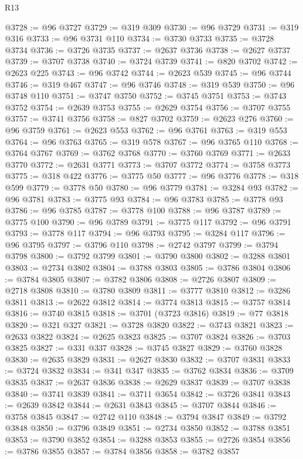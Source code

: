 \begin{lexlean}{R13}
\begin{coremodule}
{{{{{{{{{{{{{{{{{{{{{{{{{{{{{{{{{{{{{{{{{{{{{{{{{{{{{{{{{{{{{{{{{{{{{{{{{{{{{{{{{{{{{{{{{{{{{{{{{{{{{{{{{{@3728 := @96 @3727
@3729 := @319 @309
@3730 := @96 @3729
@3731 := @319 @316
@3733 := @96 @3731 @110
@3734 := @3730 @3733
@3735 := @3728 @3734
@3736 := @3726 @3735
@3737 := @2637 @3736
@3738 := @2627 @3737
@3739 := @3707 @3738
@3740 := @3724 @3739
@3741 := @820 @3702
@3742 := @2623 @225
@3743 := @96 @3742
@3744 := @2623 @539
@3745 := @96 @3744
@3746 := @319 @467
@3747 := @96 @3746
@3748 := @319 @539
@3750 := @96 @3748 @110
@3751 := @3747 @3750
@3752 := @3745 @3751
@3753 := @3743 @3752
@3754 := @2639 @3753
@3755 := @2629 @3754
@3756 := @3707 @3755
@3757 := @3741 @3756
@3758 := @827 @3702
@3759 := @2623 @276
@3760 := @96 @3759
@3761 := @2623 @553
@3762 := @96 @3761
@3763 := @319 @553
@3764 := @96 @3763
@3765 := @319 @578
@3767 := @96 @3765 @110
@3768 := @3764 @3767
@3769 := @3762 @3768
@3770 := @3760 @3769
@3771 := @2633 @3770
@3772 := @2631 @3771
@3773 := @3707 @3772
@3774 := @3758 @3773
@3775 := @318 @422
@3776 := @3775 @50
@3777 := @96 @3776
@3778 := @318 @599
@3779 := @3778 @50
@3780 := @96 @3779
@3781 := @3284 @93
@3782 := @96 @3781
@3783 := @3775 @93
@3784 := @96 @3783
@3785 := @3778 @93
@3786 := @96 @3785
@3787 := @3778 @100
@3788 := @96 @3787
@3789 := @3775 @100
@3790 := @96 @3789
@3791 := @3775 @117
@3792 := @96 @3791
@3793 := @3778 @117
@3794 := @96 @3793
@3795 := @3284 @117
@3796 := @96 @3795
@3797 := @3796 @110
@3798 := @2742 @3797
@3799 := @3794 @3798
@3800 := @3792 @3799
@3801 := @3790 @3800
@3802 := @3288 @3801
@3803 := @2734 @3802
@3804 := @3788 @3803
@3805 := @3786 @3804
@3806 := @3784 @3805
@3807 := @3782 @3806
@3808 := @2726 @3807
@3809 := @2718 @3808
@3810 := @3780 @3809
@3811 := @3777 @3810
@3812 := @3286 @3811
@3813 := @2622 @3812
@3814 := @3774 @3813
@3815 := @3757 @3814
@3816 := @3740 @3815
@3818 := @3701 (@3723 @3816)
@3819 := @77 @3818
@3820 := @321 @327
@3821 := @3728 @3820
@3822 := @3743 @3821
@3823 := @2633 @3822
@3824 := @2625 @3823
@3825 := @3707 @3824
@3826 := @3703 @3825
@3827 := @331 @337
@3828 := @3745 @3827
@3829 := @3760 @3828
@3830 := @2635 @3829
@3831 := @2627 @3830
@3832 := @3707 @3831
@3833 := @3724 @3832
@3834 := @341 @347
@3835 := @3762 @3834
@3836 := @3709 @3835
@3837 := @2637 @3836
@3838 := @2629 @3837
@3839 := @3707 @3838
@3840 := @3741 @3839
@3841 := @3711 @3654
@3842 := @3726 @3841
@3843 := @2639 @3842
@3844 := @2631 @3843
@3845 := @3707 @3844
@3846 := @3758 @3845
@3847 := @2742 @110
@3848 := @3794 @3847
@3849 := @3792 @3848
@3850 := @3796 @3849
@3851 := @2734 @3850
@3852 := @3788 @3851
@3853 := @3790 @3852
@3854 := @3288 @3853
@3855 := @2726 @3854
@3856 := @3786 @3855
@3857 := @3784 @3856
@3858 := @3782 @3857
}}}}}}}}}}}}}}}}}}}}}}}}}}}}}}}}}}}}}}}}}}}}}}}}}}}}}}}}}}}}}}}}}}}}}}}}}}}}}}}}}}}}}}}}}}}}}}}}}}}}}}}}}}
\end{coremodule}
\end{lexlean}
